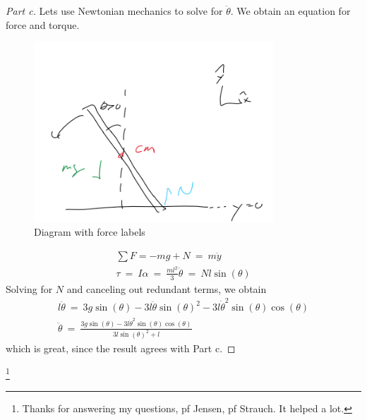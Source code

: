 \documentclass{article}
\numberwithin{equation}{section}
\begin{document}
\begin{proof}[Part c]
    Lets use Newtonian mechanics to solve for $\ddot \theta$. 
    We obtain an equation for force and torque. 
    \begin{figure}[htp]
        \centering
        \includegraphics[width=0.8\textwidth]{Q1_FBD.png} %
        \caption{Diagram with force labels}
        \label{fig:example}
    \end{figure}
    
    \begin{align}
        \sum F = -mg + N \ = \ m \ddot y \\ 
        \tau \ = \ I \alpha \ = \ \frac{ml^2} 3 \ddot \theta \ = \ N l \sin(\theta)
    \end{align}
    Solving for $N$ and canceling out redundant terms, we obtain 
    \begin{align}\label{eqn:q1a}
        l\ddot \theta \ = \ 3 g \sin(\theta) - 3 l \ddot \theta \sin(\theta)^2 - 3 l \dot\theta^2 \sin(\theta)\cos(\theta) \\ 
        \boxed{\ddot \theta \ = \ \frac{
            3 g \sin(\theta) - 3 l \dot \theta^2 \sin(\theta) \cos(\theta)
        } {3l \sin(\theta)^2 + l}}
    \end{align}
    which is great, since the result agrees with Part c. 
\end{proof} 
\footnote{Thanks for answering my questions, pf Jensen, pf Strauch. It helped a lot. }
\end{document}
